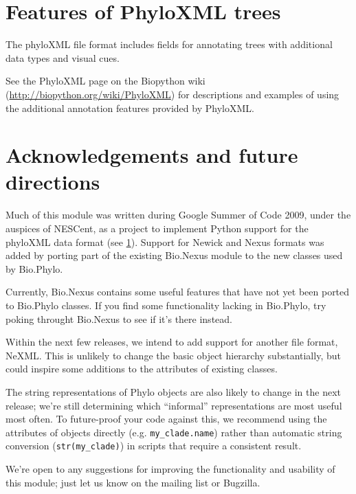 \documentclass{report}
\begin{document}
\section{Features of PhyloXML trees}
\label{sec:PhyloXML}

The phyloXML file format includes fields for annotating trees with additional data types and
visual cues.


See the PhyloXML page on the Biopython wiki (\url{http://biopython.org/wiki/PhyloXML}) for
descriptions and examples of using the additional annotation features provided by PhyloXML.


\section{Acknowledgements and future directions}
\label{sec:PhyloFuture}

Much of this module was written during Google Summer of Code 2009, under the auspices of
NESCent, as a project to implement Python support for the phyloXML data format (see
\ref{sec:PhyloXML}). Support for Newick and Nexus formats was added by porting part of the
existing Bio.Nexus module to the new classes used by Bio.Phylo.

Currently, Bio.Nexus contains some useful features that have not yet been ported to Bio.Phylo
classes. If you find some functionality lacking in Bio.Phylo, try poking throught Bio.Nexus to
see if it's there instead.

Within the next few releases, we intend to add support for another file format, NeXML. This is
unlikely to change the basic object hierarchy substantially, but could inspire some 
additions to the attributes of existing classes.

The string representations of Phylo objects are also likely to change in the next release;
we're still determining which ``informal'' representations are most useful most often. To
future-proof your code against this, we recommend using the attributes of objects directly
(e.g. \verb|my_clade.name|) rather than automatic string conversion (\verb|str(my_clade)|) in
scripts that require a consistent result.

We're open to any suggestions for improving the functionality and usability of this module;
just let us know on the mailing list or Bugzilla.
\end{document}
